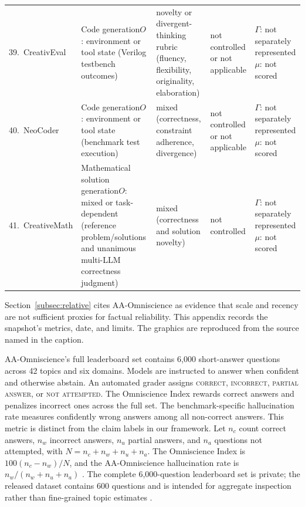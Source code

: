 \documentclass{clv2025}
\begin{document}
\begin{table}[t]
\begin{tabularx}{0.99\linewidth}{
  @{}P{0.17\textwidth}P{0.25\textwidth}
  P{0.15\textwidth}P{0.14\textwidth}Y@{}}
39.~CreativEval \citep{delorenzo_creativeval_2024} & Code generation\newline $O$: environment or tool state (Verilog testbench outcomes) & novelty or divergent-thinking rubric (fluency, flexibility, originality, elaboration) & not controlled or not applicable & $\Gamma$: not separately represented\newline $\mu$: not scored\\
40.~NeoCoder \citep{lu_benchmarking_2025} & Code generation\newline $O$: environment or tool state (benchmark test execution) & mixed (correctness, constraint adherence, divergence) & not controlled or not applicable & $\Gamma$: not separately represented\newline $\mu$: not scored\\
41.~CreativeMath \citep{ye_assessing_2025} & Mathematical solution generation\newline $O$: mixed or task-dependent (reference problem/solutions and unanimous multi-LLM correctness judgment) & mixed (correctness and solution novelty) & not controlled & $\Gamma$: not separately represented\newline $\mu$: not scored\\
\bottomrule
\end{tabularx}
\end{table}

\clearpage
{}%
\makeatletter\def\@currentlabel{C}\makeatother\label{app:omniscience}

Section~\ref{subsec:relative} cites AA-Omniscience as evidence that scale and
recency are not sufficient proxies for factual reliability.
This appendix records the snapshot's metrics, date, and limits. The graphics
are reproduced from the source named in the caption.

AA-Omniscience's full leaderboard set contains 6,000 short-answer questions
across 42 topics and six domains.
Models are instructed to answer when confident and otherwise abstain. An
automated grader assigns \textsc{correct}, \textsc{incorrect},
\textsc{partial answer}, or \textsc{not attempted}. The Omniscience Index
rewards correct answers and penalizes incorrect ones across the full set. The
benchmark-specific hallucination rate measures confidently wrong answers among
all non-correct answers. This metric is distinct from the claim labels in
our framework. Let $n_c$ count correct answers, $n_w$ incorrect answers,
$n_u$ partial answers, and $n_a$ questions not attempted, with
$N=n_{c}+n_{w}+n_{u}+n_{a}$. The Omniscience Index is
$100(n_{c}-n_{w})/N$, and the AA-Omniscience hallucination rate is
$n_{w}/(n_{w}+n_{u}+n_{a})$ \citep{jackson_aaomniscience_2025}.
The complete 6,000-question leaderboard set is private; the released dataset
contains 600 questions and is intended for aggregate inspection rather than
fine-grained topic estimates
\citep{artificialanalysis_aaomniscience_public_2025}.
\end{document}
